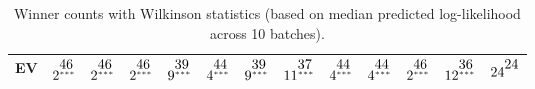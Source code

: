 \documentclass[11pt, a4paper, oneside,final,notitlepage,onecolumn]{article}\usepackage[]{graphicx}\usepackage[]{color}
\begin{document}
\begin{table}[!htb]
\begin{tabular}{rllllllllllll}
  EV & $2^{\stackrel{\textstyle46\hfill}{\scriptscriptstyle***\hfill}}$ & $2^{\stackrel{\textstyle46\hfill}{\scriptscriptstyle***\hfill}}$ & $2^{\stackrel{\textstyle46\hfill}{\scriptscriptstyle***\hfill}}$ & $9^{\stackrel{\textstyle39\hfill}{\scriptscriptstyle***\hfill}}$ & $4^{\stackrel{\textstyle44\hfill}{\scriptscriptstyle***\hfill}}$ & $9^{\stackrel{\textstyle39\hfill}{\scriptscriptstyle***\hfill}}$ & $11^{\stackrel{\textstyle37\hfill}{\scriptscriptstyle***\hfill}}$ & $4^{\stackrel{\textstyle44\hfill}{\scriptscriptstyle***\hfill}}$ & $4^{\stackrel{\textstyle44\hfill}{\scriptscriptstyle***\hfill}}$ & $2^{\stackrel{\textstyle46\hfill}{\scriptscriptstyle***\hfill}}$ & $12^{\stackrel{\textstyle36\hfill}{\scriptscriptstyle***\hfill}}$ & $24^{\stackrel{\textstyle24\hfill}{\scriptscriptstyle\hfill}}$ \\ 
   \hline
\end{tabular}
\caption{Winner counts with Wilkinson statistics (based on median predicted log-likelihood across 10 batches).} 
\label{table_ACV1_cros_val_median}
\end{table}
\end{document}
